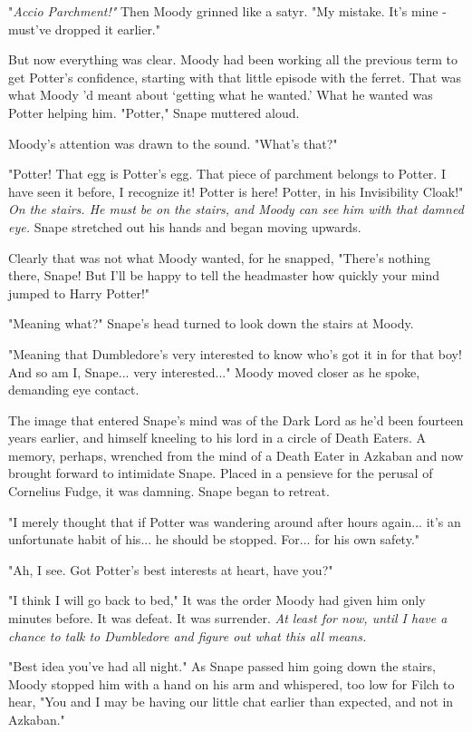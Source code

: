 \documentclass[a4paper,11pt]{article}
\begin{document}
"\emph{Accio Parchment!"} Then Moody grinned like a satyr. "My mistake. It's mine - must've dropped it earlier."

But now everything was clear. Moody had been working all the previous term to get Potter's confidence, starting with that little episode with the ferret. That was what Moody 'd meant about `getting what he wanted.' What he wanted was Potter helping him. "Potter," Snape muttered aloud.

Moody's attention was drawn to the sound. "What's that?"

"Potter! That egg is Potter's egg. That piece of parchment belongs to Potter. I have seen it before, I recognize it! Potter is here! Potter, in his Invisibility Cloak!" \emph{On the stairs. He must be on the stairs, and Moody can see him with that damned eye.} Snape stretched out his hands and began moving upwards.

Clearly that was not what Moody wanted, for he snapped, "There's nothing there, Snape! But I'll be happy to tell the headmaster how quickly your mind jumped to Harry Potter!"

"Meaning what?" Snape's head turned to look down the stairs at Moody.

"Meaning that Dumbledore's very interested to know who's got it in for that boy! And so am I, Snape... very interested..." Moody moved closer as he spoke, demanding eye contact.

The image that entered Snape's mind was of the Dark Lord as he'd been fourteen years earlier, and himself kneeling to his lord in a circle of Death Eaters. A memory, perhaps, wrenched from the mind of a Death Eater in Azkaban and now brought forward to intimidate Snape. Placed in a pensieve for the perusal of Cornelius Fudge, it was damning. Snape began to retreat.

"I merely thought that if Potter was wandering around after hours again... it's an unfortunate habit of his... he should be stopped. For... for his own safety."

"Ah, I see. Got Potter's best interests at heart, have you?"

"I think I will go back to bed," It was the order Moody had given him only minutes before. It was defeat. It was surrender. \emph{At least for now, until I have a chance to talk to Dumbledore and figure out what this all means.}

"Best idea you've had all night." As Snape passed him going down the stairs, Moody stopped him with a hand on his arm and whispered, too low for Filch to hear, "You and I may be having our little chat earlier than expected, and not in Azkaban."
\end{document}

